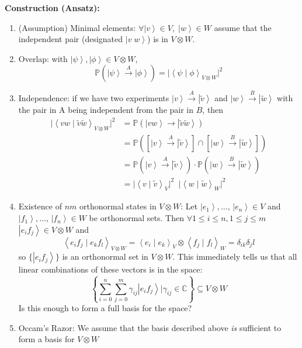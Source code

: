 \documentclass[12pt]{article}
\renewcommand{\P}{\mathbb{P}}
\newcommand{\brak}[1]{\left\langle #1 \right\rangle}
\newcommand{\C}{\mathbb{C}}
\newcommand{\ket}[1]{\left\vert #1 \right\rangle}
\begin{document}
\textbf{Construction (Ansatz):}
\begin{enumerate}
    \item (Assumption) Minimal elements: $\forall \ket v \in V,\; \ket w \in W$ assume that the independent pair (designated $\ket{v\;w}$) is in $V \otimes W$. 
    
    \item Overlap: with $\ket \psi, \ket \phi \in V\otimes W$, 
    \[\P(\ket \psi \overset{A}{\to} \ket \phi) = \bigg\vert \brak{\psi \; | \; \phi}_{V \otimes W} \bigg\vert^2\]

    \item Independence: if we have two experiments $\ket v \overset{A}{\to} \ket{\tilde{v}}$ and $\ket w \overset{B}{\to} \ket{\tilde w}$ with the pair in A being independent from the pair in $B$, then 
        \begin{align*}
            \bigg\vert \brak{v w \; | \; \tilde v \tilde w}_{V \otimes W} \bigg\vert^2 &= \P(\ket{vw} \to \ket{\tilde v \tilde w})\\
            &= \P([\ket{v} \overset{A}{\to} \ket{\tilde v}] \cap [\ket{w} \overset{B}{\to} \ket{\tilde w}])\\
            &= \P(\ket{v} \overset{A}{\to} \ket{\tilde v}) \cdot \P(\ket{w} \overset{B}{\to} \ket{\tilde w})\\
            &= \Big\vert \brak{v \; | \; \tilde v}_{V} \Big\vert^2 \;\; \Big\vert \brak{w \; | \; \tilde w}_{W} \Big\vert^2
        \end{align*}

        \item Existence of $nm$ orthonormal states in $V \otimes W$:
            Let $\ket{e_1}, \dots, \, \ket{e_n} \in V$ and $\ket{f_1}, \dots,\, \ket{f_n} \in W$ be orthonormal sets. Then $\forall 1 \leq i \leq n, 1 \leq j \leq m$ $\ket{e_i f_j} \in V \otimes W$ and 
            \[\brak{e_i f_j \; | \; e_k f_l}_{V \otimes W} = \brak{e_i \; | \; e_k}_V \otimes \brak{f_j \; | \; f_l}_W = \delta_{ik} \delta_jl\]
            so $\{\ket{e_i f_j}\}$ is an orthonormal set in $V \otimes W$. This immediately tells us that all linear combinations of these vectors is in the space:
            \[\left\{\sum_{i=0}^n \sum_{j=0}^m \gamma_{ij} \ket{e_i f_j} \bigg\vert \gamma_{ij} \in \C\right\} \subseteq V \otimes W\]
            Is this enough to form a full basis for the space? 

        \item Occam's Razor: We assume that the basis described above \emph{is} sufficient to form a basis for $V \otimes W$
\end{enumerate}
\end{document}
